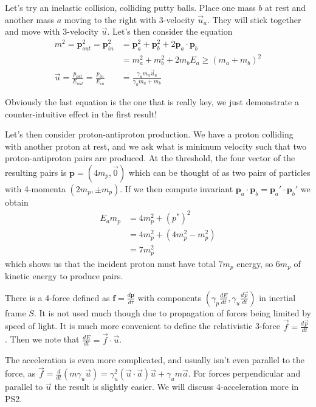 \documentclass[10pt]{report}
\newcommand{\rd}[2]{\frac{d#1}{d#2}}
\begin{document}
Let's try an inelastic collision, colliding putty balls. Place one mass $b$ at rest and another mass $a$ moving to the right with 3-velocity $\vec{u}_a$. They will stick together and move with 3-velocity $\vec{u}$. Let's then consider the equation
\begin{align}
    m^2 = \mathbf{p}_{out}^2 = \mathbf{p}_{in}^2 &= \mathbf{p}_a^2 + \mathbf{p}_b^2 + 2\mathbf{p}_a\cdot \mathbf{p}_b\\
    &= m_a^2 + m_b^2 + 2m_bE_a \geq (m_a + m_b)^2\\
    \vec{u} = \frac{p_{out}}{E_{out}} = \frac{p_{in}}{E_{in}}&= \frac{\gamma_u m_a\vec{u}_a}{\gamma_a m_a + m_b}
    \label{1.14.putty}
\end{align}

Obviously the last equation is the one that is really key, we just demonstrate a counter-intuitive effect in the first result!

Let's then consider proton-antiproton production. We have a proton colliding with another proton at rest, and we ask what is minimum velocity such that two proton-antiproton pairs are produced. At the threshold, the four vector of the resulting pairs is $\mathbf{p} = (4m_p, \vec{0})$ which can be thought of as two pairs of particles with 4-momenta $(2m_p, \pm m_p)$. If we then compute invariant $\mathbf{p}_a \cdot \mathbf{p}_b = \mathbf{p}_a' \cdot \mathbf{p}_b'$ we obtain 
\begin{align}
    E_am_p &= 4m_p^2 + (p^*)^2\\
    &= 4m_p^2 + (4m_p^2 - m_p^2)\\
    &= 7m_p^2
\end{align}
which shows us that the incident proton must have total $7m_p$ energy, so $6m_p$ of kinetic energy to produce pairs.

There is a 4-force defined as $\mathbf{f} = \rd{\mathbf{p}}{\tau}$ with components $\left( \gamma_p \rd{E}{t}, \gamma_u \rd{\vec{p}}{t} \right)$ in inertial frame $S$. It is not used much though due to propagation of forces being limited by speed of light. It is much more convenient to define the relativistic 3-force $\vec{f} = \rd{\vec{p}}{t}$. Then we note that $\rd{E}{t} = \vec{f}\cdot \vec{u}$.

The acceleration is even more complicated, and usually isn't even parallel to the force, as $\vec{f} = \rd{}{t}(m\gamma_u \vec{u}) = \gamma_u^2(\vec{u}\cdot \vec{a})\vec{u} + \gamma_u m\vec{a}$. For forces perpendicular and parallel to $\vec{u}$ the result is slightly easier. We will discuss 4-acceleration more in PS2.
\end{document}
